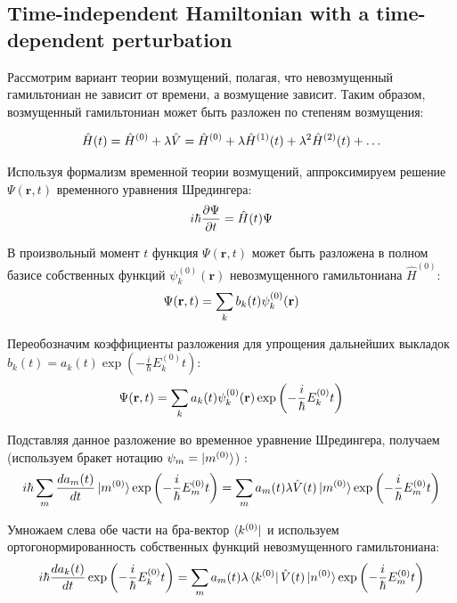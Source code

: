 \documentclass[12pt]{article}
\newcommand{\lb}{\left(}
\newcommand{\rb}{\right)}
\newcommand{\mf}{\mathbf}
\begin{document}
\subsection*{Time-independent Hamiltonian with a time-dependent perturbation}

Рассмотрим вариант теории возмущений, полагая, что невозмущенный гамильтониан не зависит от времени, а возмущение зависит. Таким образом, возмущенный гамильтониан может быть разложен по степеням возмущения:

\begin{gather}
	\hat{H}(t) = \hat{H}^{(0)} + \lambda \hat{V} = \hat{H}^{(0)} + \lambda \hat{H}^{(1)}(t) + \lambda^2 \hat{H}^{(2)}(t) + \dots \notag
\end{gather}

Используя формализм временной теории возмущений, аппроксимируем решение $\Psi(\mf{r}, t)$ временного уравнения Шредингера:
\begin{gather}
	i \hbar \frac{\partial \Psi}{\partial t} = \hat{H}(t) \Psi \notag
\end{gather}

В произвольный момент $t$ функция $\Psi(\mf{r}, t)$ может быть разложена в полном базисе собственных функций $\psi_k^{(0)}(\mf{r})$ невозмущенного гамильтониана $\hat{H}^{(0)}$:
\begin{gather}
	\Psi(\mf{r}, t) = \sum_k b_k(t) \psi_k^{(0)}(\mf{r}) \notag
\end{gather}

Переобозначим коэффициенты разложения для упрощения дальнейших выкладок $b_k(t) = a_k(t) \exp \lb - \frac{i}{\hbar} E_k^{(0)} t \rb$:
\begin{gather}
	\Psi(\mf{r}, t) = \sum_k a_k(t) \psi_k^{(0)} (\mf{r}) \exp \lb - \frac{i}{\hbar} E_k^{(0)} t \rb \notag
\end{gather}

Подставляя данное разложение во временное уравнение Шредингера, получаем (используем бракет нотацию $\psi_m = \ket{m^{(0)}}$) :
\begin{gather}
	i \hbar \sum_m \frac{d a_m(t)}{dt} \ket{m^{(0)}} \exp \lb - \frac{i}{\hbar} E_m^{(0)} t \rb = \sum_m a_m(t) \lambda \hat{V}(t) \ket{m^{(0)}} \exp \lb - \frac{i}{\hbar} E_m^{(0)} t \rb \notag  
\end{gather}

Умножаем слева обе части на бра-вектор $\bra{k^{(0)}}$ и используем ортогонормированность собственных функций невозмущенного гамильтониана:  
\begin{gather}
	i \hbar \frac{d a_k(t)}{dt} \exp \lb - \frac{i}{\hbar} E_k^{(0)} t \rb = \sum_m a_m(t) \lambda \bra {k^{(0)}} \hat{V}(t) \ket{n^{(0)}} \exp \lb - \frac{i}{\hbar} E_m^{(0)} t \rb \notag 
\end{gather}
\end{document}
